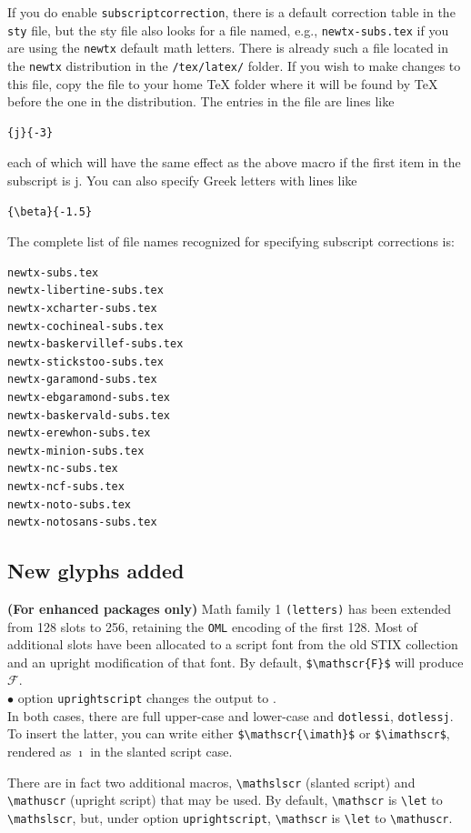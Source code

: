 \documentclass[\fsc]{article}
\theoremstyle{oldplain}
\theoremstyle{plain}
\begin{document}
If you do enable {\tt subscriptcorrection}, there is a default correction table in the {\tt sty} file, but the sty file also looks for a file named, e.g., {\tt newtx-subs.tex} if you are using the {\tt newtx} default math letters. There is already such a file located in the {\tt newtx} distribution in the \verb|/tex/latex/| folder. If you wish to make changes to this file, copy the file to your home TeX folder where it will be found by TeX before the one in the distribution. The entries in the file are lines like
\begin{verbatim}
{j}{-3}
\end{verbatim}
each of which will have the same effect as the above macro if the first item in the subscript is j. You can also specify Greek letters with lines like
\begin{verbatim}
{\beta}{-1.5}
\end{verbatim}
The complete list of file names recognized for specifying subscript corrections is:
\begin{verbatim}
newtx-subs.tex
newtx-libertine-subs.tex
newtx-xcharter-subs.tex
newtx-cochineal-subs.tex
newtx-baskervillef-subs.tex
newtx-stickstoo-subs.tex
newtx-garamond-subs.tex
newtx-ebgaramond-subs.tex
newtx-baskervald-subs.tex
newtx-erewhon-subs.tex
newtx-minion-subs.tex
newtx-nc-subs.tex
newtx-ncf-subs.tex
newtx-noto-subs.tex
newtx-notosans-subs.tex
\end{verbatim}

\subsection{New glyphs added} \textbf{(For enhanced packages only)} Math family 1 {\tt (letters)} has been extended from 128 slots to 256, retaining the {\tt OML} encoding of the first 128. Most of additional slots have been allocated to a script font from the old STIX collection and an upright modification of that font.
By default, \verb|$\mathscr{F}$| will produce $\mathscr{F}$.\\
$\bullet$ option {\tt uprightscript} changes the output to {}.\\
In both cases, there are full upper-case and lower-case and {\tt dotlessi}, {\tt dotlessj}. To insert the latter, you can write either \verb|$\mathscr{\imath}$| or \verb|$\imathscr$|, rendered as $\mathscr{\imath}$ in the slanted script case. 

There are in fact two additional macros, \verb|\mathslscr| (slanted script) and \verb|\mathuscr| (upright script) that may be used. By default, \verb|\mathscr| is \verb|\let| to \verb|\mathslscr|, but, under option {\tt uprightscript}, \verb|\mathscr| is \verb|\let| to \verb|\mathuscr|.
\end{document}
